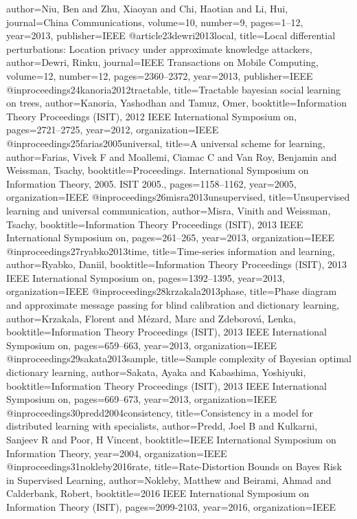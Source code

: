 {{{{{{{{{  author={Niu, Ben and Zhu, Xiaoyan and Chi, Haotian and Li, Hui},
  journal={China Communications},
  volume={10},
  number={9},
  pages={1--12},
  year={2013},
  publisher={IEEE}
}
@article{23dewri2013local,
  title={Local differential perturbations: Location privacy under approximate knowledge attackers},
  author={Dewri, Rinku},
  journal={IEEE Transactions on Mobile Computing},
  volume={12},
  number={12},
  pages={2360--2372},
  year={2013},
  publisher={IEEE}
}
@inproceedings{24kanoria2012tractable,
  title={Tractable bayesian social learning on trees},
  author={Kanoria, Yashodhan and Tamuz, Omer},
  booktitle={Information Theory Proceedings (ISIT), 2012 IEEE International Symposium on},
  pages={2721--2725},
  year={2012},
  organization={IEEE}
}
@inproceedings{25farias2005universal,
  title={A universal scheme for learning},
  author={Farias, Vivek F and Moallemi, Ciamac C and Van Roy, Benjamin and Weissman, Tsachy},
  booktitle={Proceedings. International Symposium on Information Theory, 2005. ISIT 2005.},
  pages={1158--1162},
  year={2005},
  organization={IEEE}
}
@inproceedings{26misra2013unsupervised,
  title={Unsupervised learning and universal communication},
  author={Misra, Vinith and Weissman, Tsachy},
  booktitle={Information Theory Proceedings (ISIT), 2013 IEEE International Symposium on},
  pages={261--265},
  year={2013},
  organization={IEEE}
}
@inproceedings{27ryabko2013time,
  title={Time-series information and learning},
  author={Ryabko, Daniil},
  booktitle={Information Theory Proceedings (ISIT), 2013 IEEE International Symposium on},
  pages={1392--1395},
  year={2013},
  organization={IEEE}
}
@inproceedings{28krzakala2013phase,
  title={Phase diagram and approximate message passing for blind calibration and dictionary learning},
  author={Krzakala, Florent and M{\'e}zard, Marc and Zdeborov{\'a}, Lenka},
  booktitle={Information Theory Proceedings (ISIT), 2013 IEEE International Symposium on},
  pages={659--663},
  year={2013},
  organization={IEEE}
}
@inproceedings{29sakata2013sample,
  title={Sample complexity of Bayesian optimal dictionary learning},
  author={Sakata, Ayaka and Kabashima, Yoshiyuki},
  booktitle={Information Theory Proceedings (ISIT), 2013 IEEE International Symposium on},
  pages={669--673},
  year={2013},
  organization={IEEE}
}
@inproceedings{30predd2004consistency,
  title={Consistency in a model for distributed learning with specialists},
  author={Predd, Joel B and Kulkarni, Sanjeev R and Poor, H Vincent},
  booktitle={IEEE International Symposium on Information Theory},
  year={2004},
organization={IEEE}
}
@inproceedings{31nokleby2016rate,
  title={Rate-Distortion Bounds on Bayes Risk in Supervised Learning},
  author={Nokleby, Matthew and Beirami, Ahmad and Calderbank, Robert},
  booktitle={2016 IEEE International Symposium on Information Theory (ISIT)},
pages={2099-2103},
  year={2016},
organization={IEEE}
}

}}}}}}}}
